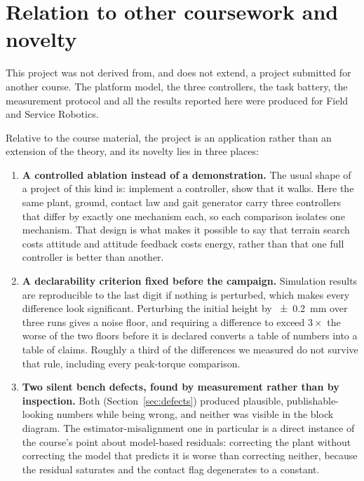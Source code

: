 \documentclass[11pt,a4paper]{article}
\begin{document}
\section{Relation to other coursework and novelty}
\label{sec:novelty}

This project was not derived from, and does not extend, a project submitted
for another course. The platform model, the three controllers, the task
battery, the measurement protocol and all the results reported here were
produced for Field and Service Robotics.

Relative to the course material, the project is an application rather than an
extension of the theory, and its novelty lies in three places:

\begin{enumerate}
\item \textbf{A controlled ablation instead of a demonstration.} The usual
shape of a project of this kind is: implement a controller, show that it
walks. Here the same plant, ground, contact law and gait generator carry three
controllers that differ by exactly one mechanism each, so each comparison
isolates one mechanism. That design is what makes it possible to say that
terrain search costs attitude and attitude feedback costs energy, rather than
that one full controller is better than another.

\item \textbf{A declarability criterion fixed before the campaign.} Simulation
results are reproducible to the last digit if nothing is perturbed, which
makes every difference look significant. Perturbing the initial height by
\SI{\pm 0.2}{\milli\meter} over three runs gives a noise floor, and requiring a
difference to exceed $3\times$ the worse of the two floors before it is
declared converts a table of numbers into a table of claims. Roughly a third
of the differences we measured do not survive that rule, including every
peak-torque comparison.

\item \textbf{Two silent bench defects, found by measurement rather than by
inspection.} Both (Section~\ref{sec:defects}) produced plausible,
publishable-looking numbers while being wrong, and neither was visible in the
block diagram. The estimator-misalignment one in particular is a direct
instance of the course's point about model-based residuals: correcting the
plant without correcting the model that predicts it is worse than correcting
neither, because the residual saturates and the contact flag degenerates to a
constant.
\end{enumerate}
\end{document}
